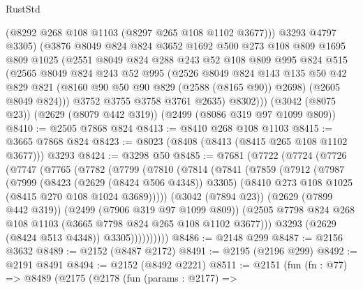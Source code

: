 \begin{lexlean}{RustStd}
\begin{coremodule}
            (@8292 @268 @108 @1103 (@8297 @265 @108 @1102 @3677)))
          @3293
          @4797
          @3305)
        (@3876
          @8049
          @824
          @824
          @3652
          @1692
          @500
          @273
          @108
          @809
          @1695
          @809
          @1025
          (@2551
            @8049
            @824
            @288
            @243
            @52
            @108
            @809
            @995
            @824
            @515
            (@2565
              @8049
              @824
              @243
              @52
              @995
              (@2526
                @8049
                @824
                @143
                @135
                @50
                @42
                @829
                @821
                (@8160 @90 @50 @90 @829 (@2588 (@8165 @90)) @2698)
                (@2605 @8049 @824)))
            @3752
            @3755
            @3758
            @3761
            @2635)
          @8302)))
    (@3042 (@8075 @23))
    (@2629 (@8079 @442 @319))
    (@2499 (@8086 @319 @97 @1099 @809))
@8410 := @2505 @7868 @824
@8413 := @8410 @268 @108 @1103
@8415 := @3665 @7868 @824
@8423 := @8023 (@8408 (@8413 (@8415 @265 @108 @1102 @3677))) @3293
@8424 := @3298 @50
@8485 := @7681
    (@7722
      (@7724
        (@7726
          (@7747
            (@7765
              (@7782
                (@7799
                  (@7810
                    (@7814
                      (@7841
                        (@7859
                          (@7912
                            (@7987
                              (@7999
                                (@8423 (@2629 (@8424 @506 @4348)) @3305)
                                (@8410 @273 @108 @1025 (@8415 @270 @108 @1024 @3689)))))
                          (@3042 (@7894 @23))
                          (@2629 (@7899 @442 @319))
                          (@2499 (@7906 @319 @97 @1099 @809))
                          (@2505
                            @7798
                            @824
                            @268
                            @108
                            @1103
                            (@3665 @7798 @824 @265 @108 @1102 @3677)))
                        @3293
                        (@2629 (@8424 @513 @4348))
                        @3305))))))))))
@8486 := @2148 @299
@8487 := @2156 @3632
@8489 := @2152 (@8487 @2172)
@8491 := @2195 (@2196 @299)
@8492 := @2191 @8491
@8494 := @2152 (@8492 @2221)
@8511 := @2151
    (fun (fn : @77) =>
    @8489
      (@2175
        (@2178
          (fun (params : @2177) =>

\end{coremodule}
\end{lexlean}
